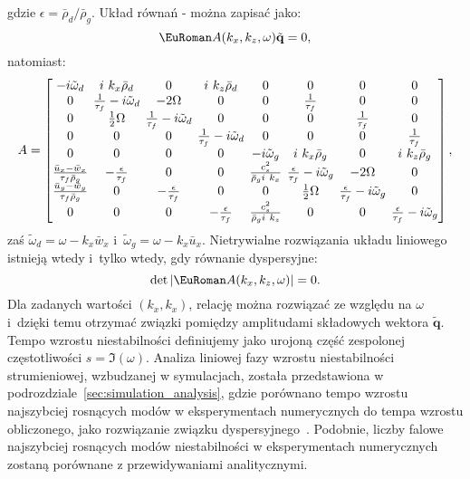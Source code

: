 %
gdzie $\epsilon = \bar{\rho}_d/\bar{\rho}_g$. Układ równań
- można zapisać jako:
%
\begin{equation}
 \eurom{A}(k_x,k_z,\omega)\tilde{\mathbf{q}} = 0,
 \label{eq:linset}
\end{equation}
natomiast: 
\begin{equation}
 A =
 \setlength\arraycolsep{2pt}
 \begin{bmatrix}
    -i\tilde{\omega}_d & i~k_x \bar{\rho}_d & 0 & i~k_z \bar{\rho}_d & 0 & 0 & 0 & 0 \\
    0 & \frac{1}{\tau_f} -i \tilde{\omega}_d & -2\Omega & 0 & 0 & \frac{1}{\tau_f} & 0 & 0 \\
    0 & \frac{1}{2}\Omega & \frac{1}{\tau_f} -i \tilde{\omega}_d & 0 & 0 & 0 & \frac{1}{\tau_f} & 0 \\
    0 & 0 & 0 & \frac{1}{\tau_f} -i \tilde{\omega}_d & 0 & 0 & 0 & \frac{1}{\tau_f} \\
    0 & 0 & 0 & 0 & -i\tilde{\omega}_g & i~k_x \bar{\rho}_g & 0 & i~k_z \bar{\rho}_g \\
    \frac{\bar{u}_x - \bar{w}_x}{\tau_f \bar{\rho}_g} & -\frac{\epsilon}{\tau_f} & 0 & 0 &
    \frac{c_s^2}{\bar{\rho}_g i~k_x} & \frac{\epsilon}{\tau_f}-i\tilde{\omega}_g &
    -2\Omega & 0\\
    \frac{\bar{u}_y - \bar{w}_y}{\tau_f \bar{\rho}_g} & 0 & -\frac{\epsilon}{\tau_f} & 0 & 0 &
    \frac{1}{2}\Omega & \frac{\epsilon}{\tau_f} -i \tilde{\omega}_g & 0 \\
    0 & 0 & 0 & -\frac{\epsilon}{\tau_f} & \frac{c_s^2}{\bar{\rho}_g i~k_z} & 0 & 0 &
    \frac{\epsilon}{\tau_f} -i \tilde{\omega}_g
 \end{bmatrix},
%
\end{equation}
zaś $\tilde{\omega}_d = \omega - k_x \bar{w}_x$ i~$\tilde{\omega}_g = \omega -
k_x \bar{u}_x$.
%
Nietrywialne rozwiązania układu liniowego  istnieją wtedy i~tylko
wtedy, gdy równanie dyspersyjne:
\begin{equation}
 \det|\eurom{A}(k_x,k_z,\omega)|=0.
 \label{eq:disprel}
\end{equation}
%
Dla zadanych wartości $(k_x, k_x)$, relację  można rozwiązać ze
względu na $\omega$ i~dzięki temu otrzymać związki pomiędzy amplitudami
składowych wektora $\tilde{\mathbf{q}}$.
Tempo wzrostu niestabilności definiujemy jako urojoną część zespolonej
częstotliwości $s=\Im(\omega)$.
%
Analiza  liniowej fazy wzrostu niestabilności strumieniowej, wzbudzanej w
symulacjach, została przedstawiona w podrozdziale~\ref{sec:simulation_analysis},
gdzie porównano tempo wzrostu najszybciej rosnących modów w eksperymentach
numerycznych do tempa wzrostu obliczonego, jako rozwiązanie związku
dyspersyjnego~. Podobnie, liczby falowe  najszybciej rosnących
modów niestabilności w eksperymentach numerycznych zostaną porównane z
przewidywaniami analitycznymi.

